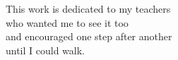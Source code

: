 \begin{dedication}
\null\vfil {
\begin{center}
This work is dedicated to my teachers \\
who wanted me to see it too \\
and encouraged one step after another \\
until I could walk.
\end{center}}
\vfil\null
\end{dedication}

